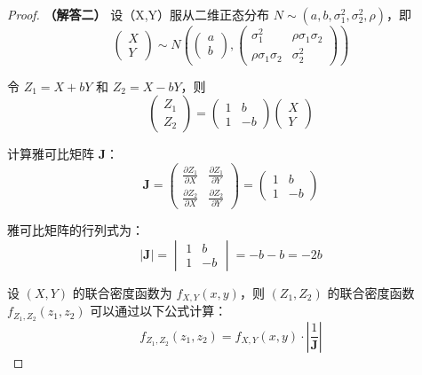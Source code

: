 \documentclass[UTF8]{report}
\theoremstyle{MyLineTheoremStyle} %
\theoremstyle{MyBlockTheoremStyle} %
\theoremstyle{MySubsubsectionStyle} %
\begin{document}
\begin{proof}
\vspace{1em}
    \textbf{（解答二）}
    设（X,Y）服从二维正态分布 $N \sim (a,b,\sigma_1^2,\sigma_2^2,\rho)$，即
    \[
    \begin{pmatrix}
    X \\
    Y
    \end{pmatrix}
    \sim N\left(
    \begin{pmatrix}
    a \\
    b
    \end{pmatrix},
    \begin{pmatrix}
    \sigma_1^2 & \rho\sigma_1\sigma_2 \\
    \rho\sigma_1\sigma_2 & \sigma_2^2
    \end{pmatrix}
    \right)
    \]

    令 $Z_1 = X + bY$ 和 $Z_2 = X - bY$，则
    \[
    \begin{pmatrix}
    Z_1 \\
    Z_2
    \end{pmatrix}
    =
    \begin{pmatrix}
        1 & b \\
        1 & -b
    \end{pmatrix}
    \begin{pmatrix}
        X \\
        Y
    \end{pmatrix}
    \]

    计算雅可比矩阵 $\mathbf{J}$：
    \[
    \mathbf{J} = \begin{pmatrix}
    \frac{\partial Z_1}{\partial X} & \frac{\partial Z_1}{\partial Y} \\
    \frac{\partial Z_2}{\partial X} & \frac{\partial Z_2}{\partial Y}
    \end{pmatrix}
    =
    \begin{pmatrix}
    1 & b \\
    1 & -b
    \end{pmatrix}
    \]

    雅可比矩阵的行列式为：
    \[
    |\mathbf{J}| = \begin{vmatrix}
    1 & b \\
    1 & -b
    \end{vmatrix} = -b - b = -2b
    \]

    设 $(X, Y)$ 的联合密度函数为 $f_{X,Y}(x,y)$，则 $(Z_1, Z_2)$ 的联合密度函数 $f_{Z_1,Z_2}(z_1,z_2)$ 可以通过以下公式计算：
    \[
    f_{Z_1,Z_2}(z_1,z_2) = f_{X,Y}(x,y) \cdot \left| \frac{1}{\mathbf{J}} \right|
    \]


\end{proof}
\end{document}
